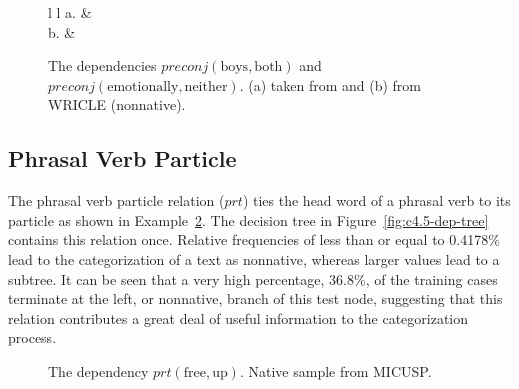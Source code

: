 \documentclass[main.tex]{subfiles}
\begin{document}
\begin{figure}[h]
\caption{The dependencies $preconj(\text{boys},\text{both})$ and $preconj(\text{emotionally},\text{neither})$. (a) taken from \citet{typed-deps-manual} and (b) from WRICLE (nonnative).}
\centering
\begin{tabular}{ l l }
a. &
\\

b. &

\label{fig:preconj-dep}
\end{tabular}
\end{figure}


\subsection{Phrasal Verb Particle}

The phrasal verb particle relation ($prt$) ties the head word of a phrasal verb to its particle as shown in Example~\ref{ex:prt-en1}. The decision tree in Figure~\ref{fig:c4.5-dep-tree} contains this relation once. Relative frequencies of less than or equal to 0.4178\% lead to the categorization of a text as nonnative, whereas larger values lead to a subtree. It can be seen that a very high percentage, 36.8\%, of the training cases terminate at the left, or nonnative, branch of this test node, suggesting that this relation contributes a great deal of useful information to the categorization process.

\begin{figure}[h]
\caption{The dependency $prt(\text{free},\text{up})$. Native sample from MICUSP.}
\centering
{}
\label{ex:prt-en1}
\end{figure}
\end{document}
